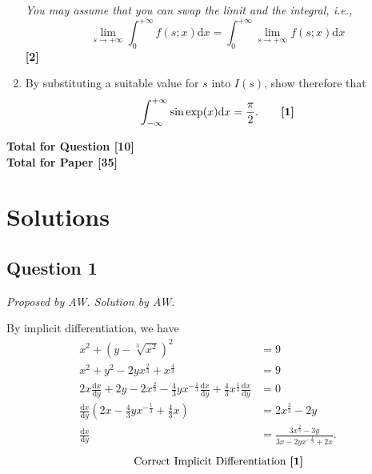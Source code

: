 \documentclass[12pt]{article}
\begin{document}
\begin{enumerate}
                    \textit{You may assume that you can swap the limit and the integral, i.e., }
                    \[
                    \lim_{s \rightarrow +\infty} \int_0^{+\infty} f(s; x) \mathrm{d}x = \int_0^{+\infty} \lim_{s \rightarrow +\infty} f(s; x) \mathrm{d}x
                    \]
                    \hfill\textbf{[2]}
            
                \item By substituting a suitable value for \(s\) into \(I(s)\), show therefore that
                    \[
                    \int_{-\infty}^{+\infty} \sin \exp(x)  \mathrm{d} x = \frac{\pi}{2}. \tag*{\textbf{[1]}}
                    \]
            \end{enumerate}
            
            \hfill\textbf{Total for Question [10]}\\
        
        \hfill\textbf{Total for Paper [35]}

    \newpage
    
    
    
    
    \section{Solutions}
    
        \subsection{Question 1}
            \textit{Proposed by AW. Solution by AW.}

            By implicit differentiation, we have
            \begin{align*}
                x^2 + \left(y - \sqrt[3]{x^2}\right)^2 &= 9\\
                x^2 + y^2 - 2yx^{\frac{2}{3}} + x^{\frac{4}{3}} &= 9\\
                2x \frac{\mathrm{d}x}{\mathrm{d}y} + 2y - 2x^{\frac{2}{3}} - \frac{4}{3}yx^{-\frac{1}{3}} \frac{\mathrm{d}x}{\mathrm{d}y} + \frac{4}{3} x^\frac{1}{3} \frac{\mathrm{d}x}{\mathrm{d}y} &= 0\\
                \frac{\mathrm{d}x}{\mathrm{d}y} \left(2x - \frac{4}{3} y x^{-\frac{1}{3}} + \frac{4}{3}x\right) &= 2x^{\frac{2}{3}} - 2y\\
                \frac{\mathrm{d}x}{\mathrm{d}y} &= \frac{3x^{\frac{2}{3}} - 3y}{3x - 2y x^{-\frac{1}{3}} + 2x}.
            \end{align*}
            \[\tag*{Correct Implicit Differentiation \textbf{[1]}}\]
\end{document}

